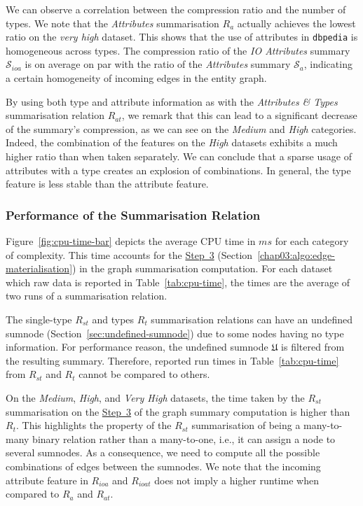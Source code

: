 We can observe a correlation between the compression ratio and the number of types.
We note that the \emph{Attributes} summarisation $R_a$ actually achieves the lowest ratio on the \emph{very high} dataset. This shows that the use of attributes in \texttt{dbpedia} is homogeneous across types. The compression ratio of the \emph{IO Attributes} summary $\mathcal{S}_{ioa}$ is on average on par with the ratio of the \emph{Attributes} summary $\mathcal{S}_a$, indicating a certain homogeneity of incoming edges in the entity graph.

By using both type and attribute information as with the \emph{Attributes \& Types} summarisation relation $R_{at}$, we remark that this can lead to a significant decrease of the summary's compression, as we can see on the \emph{Medium} and \emph{High} categories.
Indeed, the combination of the features on the \emph{High} datasets exhibits a much higher ratio than when taken separately.%
We can conclude that a sparse usage of attributes with a type creates an explosion of combinations. In general, the type feature is less stable than the attribute feature.



\subsubsection{Performance of the Summarisation Relation}

Figure~\ref{fig:cpu-time-bar} depicts the average CPU time in $ms$ for each category of complexity. This time accounts for the \hyperref[step-he]{Step~3} (Section~\ref{chap03:algo:edge-materialisation}) in the graph summarisation computation.
For each dataset which raw data is reported in Table~\ref{tab:cpu-time}, the times are the average of two runs of a summarisation relation.

The single-type $R_{st}$ and types $R_t$ summarisation relations can have an undefined sumnode (Section~\ref{sec:undefined-sumnode}) due to some nodes having no type information. For performance reason, the undefined sumnode $\mathfrak{U}$ is filtered from the resulting summary. Therefore, reported run times in Table~\ref{tab:cpu-time} from $R_{st}$ and $R_t$ cannot be compared to others.

On the \emph{Medium}, \emph{High}, and \emph{Very High} datasets, the time taken by the $R_{st}$ summarisation on the \hyperref[step-he]{Step~3} of the graph summary computation is higher than $R_t$. This highlights the property of the $R_{st}$ summarisation of being a many-to-many binary relation rather than a many-to-one, i.e., it can assign a node to several sumnodes. As a consequence, we need to compute all the possible combinations of edges between the sumnodes.
We note that the incoming attribute feature in $R_{ioa}$ and $R_{ioat}$ does not imply a higher runtime when compared to $R_{a}$ and $R_{at}$.

